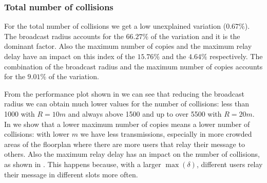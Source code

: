 \subsubsection{Total number of collisions}\label{subsubsec:hd2krcollisions}

For the total number of collisions we get a low unexplained variation
(\(0.67\%\)). The broadcast radius accounts for the \(66.27\%\) of the variation
and it is the dominant factor. Also the maximum number of copies and the maximum
relay delay have an impact on this index of the \(15.76\%\) and the \(4.64\%\)
respectively. The combination of the broadcast radius and the maximum number of
copies accounts for the \(9.01\%\) of the variation.

From the performance plot shown in  we can see
that reducing the broadcast radius we can obtain much lower values for the
number of collisions: less than 1000 with \(R\!=\!10m\) and always above 1500
and up to over 5500 with \(R\!=\!20m\). In  we
show that a lower maximum number of copies means a lower number of collisions:
with lower \(m\) we have less transmissions, especially in more crowded areas of
the floorplan where there are more users that relay their message to others.
Also the maximum relay delay has an impact on the number of collisions, as shown
in . This happens because, with a larger
\(\max(\delta)\), different users relay their message in different slots more
often.

